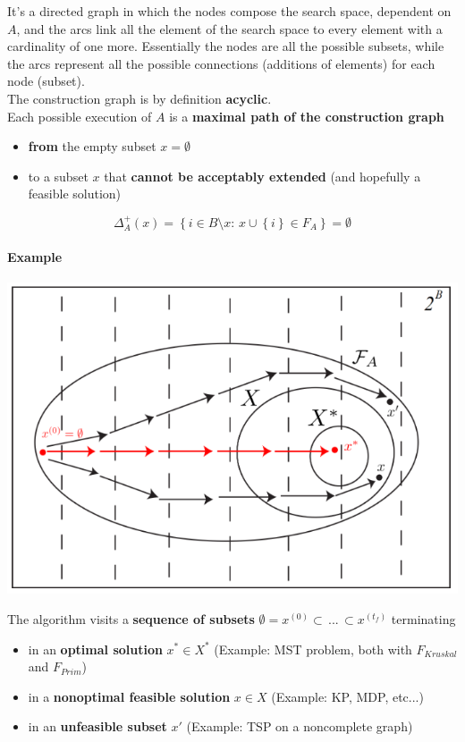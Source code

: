 It's a directed graph in which the nodes compose the search space, dependent on $A$, and the arcs link all the element of the search space to every element with a cardinality of one more. Essentially the nodes are all the possible subsets, while the arcs represent all the possible connections (additions of elements) for each node (subset).\\

The construction graph is by definition \textbf{acyclic}.\\

Each possible execution of $A$ is a \textbf{maximal path of the construction graph}
\begin{itemize}
	\item \textbf{from} the empty subset $x = \emptyset$
	\item to a subset $x$ that \textbf{cannot be acceptably extended} (and hopefully a feasible solution)
\end{itemize}
$$ \Delta^+_A (x) = \left\{i \in B \setminus x : \, x \cup \left\{i\right\} \in F_A \right\} = \emptyset $$

\newpage

\paragraph{Example}
\begin{center}
	\includegraphics[width=0.8\columnwidth]{img/CGraph1}
\end{center}
The algorithm visits a \textbf{sequence of subsets} $\emptyset = x^{(0)} \subset \, ... \, \subset x^{(t_f)}$ terminating
\begin{itemize}
	\item in an \textbf{optimal solution} $x^\ast \in X^\ast$ (Example: MST problem, both with $F_{Kruskal}$ and $F_{Prim}$)
	\item in a \textbf{nonoptimal feasible solution} $x \in X$ (Example: KP, MDP, etc...)
	\item in an \textbf{unfeasible subset} $x'$ (Example: TSP on a noncomplete graph)
\end{itemize}

